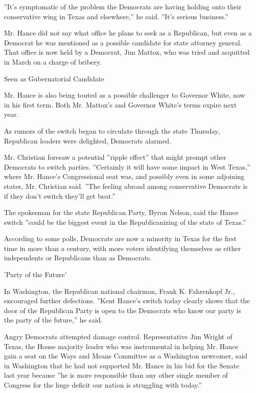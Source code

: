 ''It's symptomatic of the problem the Democrats are having holding onto
their conservative wing in Texas and elsewhere,'' he said. ''It's
serious business.''

Mr. Hance did not say what office he plans to seek as a Republican, but
even as a Democrat he was mentioned as a possible candidate for state
attorney general. That office is now held by a Democrat, Jim Mattox, who
was tried and acquitted in March on a charge of bribery.

Seen as Gubernatorial Candidate

Mr. Hance is also being touted as a possible challenger to Governor
White, now in his first term. Both Mr. Mattox's and Governor White's
terms expire next year.

As rumors of the switch began to circulate through the state Thursday,
Republican leaders were delighted, Democrats alarmed.

Mr. Christian foresaw a potential ''ripple effect'' that might prompt
other Democrats to switch parties. ''Certainly it will have some impact
in West Texas,'' where Mr. Hance's Congressional seat was, and possibly
even in some adjoining states, Mr. Christian said. ''The feeling abroad
among conservative Democrats is if they don't switch they'll get beat.''

The spokesman for the state Republican Party, Byron Nelson, said the
Hance switch ''could be the biggest event in the Republicanizing of the
state of Texas.''

According to some polls, Democrats are now a minority in Texas for the
first time in more than a century, with more voters identifying
themselves as either independents or Republicans than as Democrats.

'Party of the Future'

In Washington, the Republican national chairman, Frank K. Fahrenkopf
Jr., encouraged further defections. ''Kent Hance's switch today clearly
shows that the door of the Republican Party is open to the Democrats who
know our party is the party of the future,'' he said.

Angry Democrats attempted damage control. Representative Jim Wright of
Texas, the House majority leader who was instrumental in helping Mr.
Hance gain a seat on the Ways and Means Committee as a Washington
newcomer, said in Washington that he had not supported Mr. Hance in his
bid for the Senate last year because ''he is more responsible than any
other single member of Congress for the huge deficit our nation is
struggling with today.''

